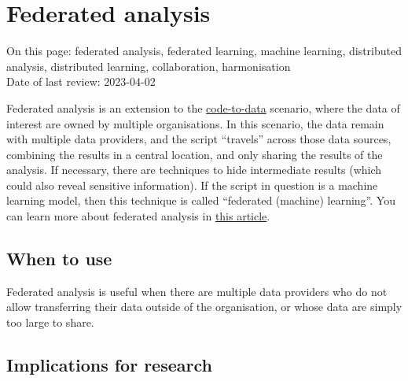 \documentclass[
]{book}
\begin{document}
\hypertarget{federated-analysis}{%
\section{Federated analysis}\label{federated-analysis}}

On this page: federated analysis, federated learning, machine learning,
distributed analysis, distributed learning, collaboration, harmonisation\\
Date of last review: 2023-04-02

Federated analysis is an extension to the \protect\hyperlink{code-to-data}{code-to-data} scenario,
where the data of interest are owned by multiple organisations. In this scenario,
the data remain with multiple data providers, and the script ``travels'' across
those data sources, combining the results in a central location, and only
sharing the results of the analysis. If necessary, there are techniques to hide
intermediate results (which could also reveal sensitive information). If the
script in question is a machine learning model, then this technique is called
``federated (machine) learning''. You can learn more about federated analysis in
\href{https://foldercase.com/blog-federated-data-analysis-how-to-get-started.php}{this article}.

\hypertarget{when-to-use-2}{%
\subsection{When to use}\label{when-to-use-2}}

Federated analysis is useful when there are multiple data providers who do not
allow transferring their data outside of the organisation, or whose data are
simply too large to share.

\hypertarget{implications-for-research-2}{%
\subsection{Implications for research}\label{implications-for-research-2}}
\end{document}
